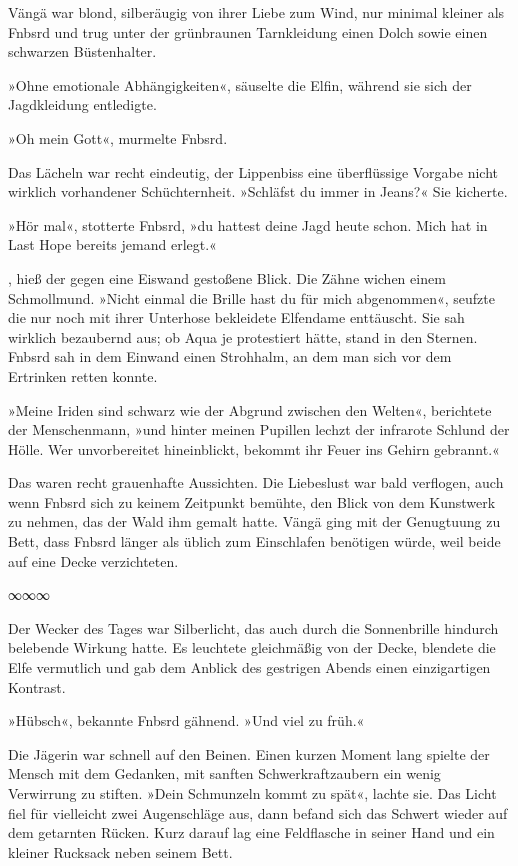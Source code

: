 Vängä war blond, silberäugig von ihrer Liebe zum Wind, nur minimal kleiner als Fnbsrd und trug unter der grünbraunen Tarnkleidung einen Dolch sowie einen schwarzen Büstenhalter.

»Ohne emotionale Abhängigkeiten«, säuselte die Elfin, während sie sich der Jagdkleidung entledigte.

»Oh mein Gott«, murmelte Fnbsrd. 

Das Lächeln war recht eindeutig, der Lippenbiss eine überflüssige Vorgabe nicht wirklich vorhandener Schüchternheit. »Schläfst du immer in Jeans?« Sie kicherte.

»Hör mal«, stotterte Fnbsrd, »du hattest deine Jagd heute schon. Mich hat in Last Hope bereits jemand erlegt.«

, hieß der gegen eine Eiswand gestoßene Blick. Die Zähne wichen einem Schmollmund. »Nicht einmal die Brille hast du für mich abgenommen«, seufzte die nur noch mit ihrer Unterhose bekleidete Elfendame enttäuscht. Sie sah wirklich bezaubernd aus; ob Aqua je protestiert hätte, stand in den Sternen. Fnbsrd sah in dem Einwand einen Strohhalm, an dem man sich vor dem Ertrinken retten konnte.

»Meine Iriden sind schwarz wie der Abgrund zwischen den Welten«, berichtete der Menschenmann, »und hinter meinen Pupillen lechzt der infrarote Schlund der Hölle. Wer unvorbereitet hineinblickt, bekommt ihr Feuer ins Gehirn gebrannt.«

Das waren recht grauenhafte Aussichten. Die Liebeslust war bald verflogen, auch wenn Fnbsrd sich zu keinem Zeitpunkt bemühte, den Blick von dem Kunstwerk zu nehmen, das der Wald ihm gemalt hatte. Vängä ging mit der Genugtuung zu Bett, dass Fnbsrd länger als üblich zum Einschlafen benötigen würde, weil beide auf eine Decke verzichteten.

\begin{center}
∞∞∞
\end{center}

Der Wecker des Tages war Silberlicht, das auch durch die Sonnenbrille hindurch belebende Wirkung hatte. Es leuchtete gleichmäßig von der Decke, blendete die Elfe vermutlich und gab dem Anblick des gestrigen Abends einen einzigartigen Kontrast.

»Hübsch«, bekannte Fnbsrd gähnend. »Und viel zu früh.«

Die Jägerin war schnell auf den Beinen. Einen kurzen Moment lang spielte der Mensch mit dem Gedanken, mit sanften Schwerkraftzaubern ein wenig Verwirrung zu stiften. »Dein Schmunzeln kommt zu spät«, lachte sie. Das Licht fiel für vielleicht zwei Augenschläge aus, dann befand sich das Schwert wieder auf dem getarnten Rücken. Kurz darauf lag eine Feldflasche in seiner Hand und ein kleiner Rucksack neben seinem Bett.

